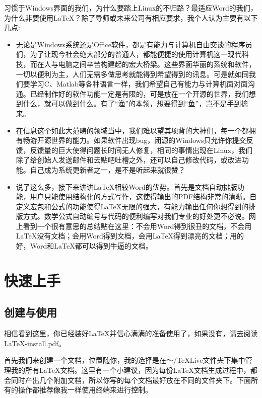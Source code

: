 \documentclass{article}
\begin{document}
习惯于Windows界面的我们，为什么要踏上Linux的不归路？最适应Word的我们，为什么非要使用\LaTeX ？除了导师或未来公司有相应要求，我个人认为主要有以下几点:

\begin{itemize}
\item 无论是Windows系统还是Office软件，都是有能力与计算机自由交谈的程序员们，为了让现今社会绝大部分的普通人，都能便捷的使用计算机这一现代科技，而在人与电脑之间辛苦构建起的宏大桥梁。这些界面华丽的系统和软件，一切以便利为主，人们无需多做思考就能得到希望得到的讯息。可是就如同我们要学习C、Matlab等各种语言一样，我们希望自己有能力与计算机面对面沟通。已经制作好的软件功能一定是有限的，可是放在一个开源的世界，我们想到什么，就可以做到什么。有了“渔”的本领，想要得到“鱼”，岂不是手到擒来。

\item 在信息这个如此大范畴的领域当中，我们难以望其项背的大神们，每一个都拥有畅游开源世界的能力。如果软件出现bug，闭源的Windows只允许你提交反馈，反馈量的巨大使得问题长时间无人修复，相同的事情出现在Linux，我们除了给创始人发送邮件和去贴吧吐槽之外，还可以自己修改代码，或改进功能。自己成为系统更新者之一，是不是听起来就很赞？

\item 说了这么多，接下来讲讲\LaTeX 相较Word的优势。首先是文档自动排版功能，用户只能使用结构化的方式写作，这使得输出的PDF结构非常的清晰。自定义宏包和公式的功能使得\LaTeX 无限的强大，有能力输出任何你想得到的排版方式。数学公式自动编号与代码的便利编写对我们专业的好处更不必说。网上看到一个很有意思的总结贴在这里：不会用Word得到很丑的文档，不会用\LaTeX 没有文档；会用Word得到文档，会用\LaTeX 得到漂亮的文档；用的好，Word和\LaTeX 都可以得到牛逼的文档。
\end{itemize}
\newpage
\section{快速上手}

\subsection{创建与使用}

相信看到这里，你已经装好\LaTeX 并信心满满的准备使用了，如果没有，请去阅读LaTeX-install.pdf。

首先我们来创建一个文档，位置随你，我的选择是在～/TeXLive文件夹下集中管理我的所有\LaTeX 文档。这里有一个小建议，因为每份\LaTeX 文档生成过程中，都会同时产出几个附加文档，所以你写的每个文档最好放在不同的文件夹下。下面所有的操作都推荐像我一样使用终端来进行控制。
\end{document}
